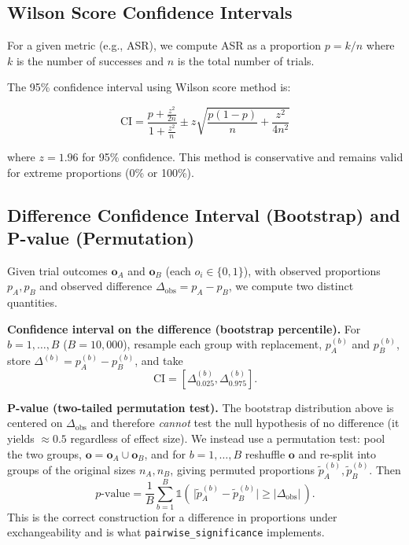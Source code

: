 \subsection{Wilson Score Confidence Intervals}

For a given metric (e.g., ASR), we compute ASR as a proportion $p = k / n$ where $k$ is the number of successes and $n$ is the total number of trials.

The 95\% confidence interval using Wilson score method is:

\begin{equation}
\text{CI} = \frac{p + \frac{z^2}{2n}}{1 + \frac{z^2}{n}} \pm z \sqrt{\frac{p(1-p)}{n} + \frac{z^2}{4n^2}}
\end{equation}

where $z = 1.96$ for 95\% confidence. This method is conservative and remains valid for extreme proportions (0\% or 100\%).

\subsection{Difference Confidence Interval (Bootstrap) and P-value (Permutation)}

Given trial outcomes $\mathbf{o}_A$ and $\mathbf{o}_B$ (each $o_i \in \{0,1\}$),
with observed proportions $p_A, p_B$ and observed difference
$\Delta_{\text{obs}} = p_A - p_B$, we compute two distinct quantities.

\textbf{Confidence interval on the difference (bootstrap percentile).} For
$b = 1, \ldots, B$ ($B = 10{,}000$), resample each group with replacement,
$p_A^{(b)}$ and $p_B^{(b)}$, store $\Delta^{(b)} = p_A^{(b)} - p_B^{(b)}$, and take
\begin{equation}
  \text{CI} = [\Delta_{0.025}^{(b)}, \Delta_{0.975}^{(b)}].
\end{equation}

\textbf{P-value (two-tailed permutation test).} The bootstrap distribution above
is centered on $\Delta_{\text{obs}}$ and therefore \emph{cannot} test the null
hypothesis of no difference (it yields $\approx 0.5$ regardless of effect size).
We instead use a permutation test: pool the two groups,
$\mathbf{o} = \mathbf{o}_A \cup \mathbf{o}_B$, and for $b = 1, \ldots, B$ reshuffle
$\mathbf{o}$ and re-split into groups of the original sizes $n_A, n_B$, giving
permuted proportions $\tilde{p}_A^{(b)}, \tilde{p}_B^{(b)}$. Then
\begin{equation}
  p\text{-value} = \frac{1}{B} \sum_{b=1}^{B}
    \mathbb{1}\!\left(\,\bigl|\tilde{p}_A^{(b)} - \tilde{p}_B^{(b)}\bigr|
    \geq |\Delta_{\text{obs}}|\,\right).
\end{equation}
This is the correct construction for a difference in proportions under
exchangeability and is what \texttt{pairwise\_significance} implements.

